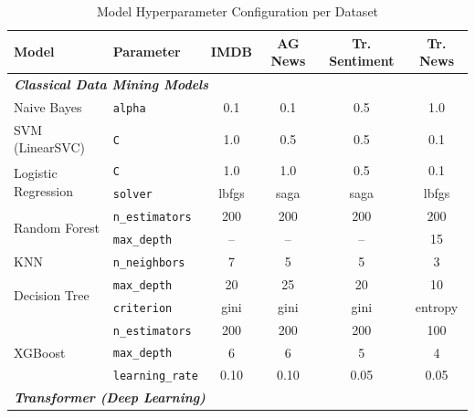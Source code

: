 \documentclass[conference]{IEEEtran}
\begin{document}
\begin{table}[t]
	\caption{Model Hyperparameter Configuration per Dataset}
	\label{tab:model_params}
	\begin{center}
		\small
		\setlength{\tabcolsep}{7pt}
		\renewcommand{\arraystretch}{1.25}
		\begin{tabular}{llcccc}
			\toprule
			\rowcolor{headerblue}
			\color{white}\textbf{Model} &
			\color{white}\textbf{Parameter} &
			\color{white}\textbf{IMDB} &
			\color{white}\textbf{AG News} &
			\color{white}\textbf{Tr. Sentiment} &
			\color{white}\textbf{Tr. News} \\
			\midrule
			\multicolumn{6}{l}{\cellcolor{groupgray}\textit{\textbf{Classical Data Mining Models}}} \\
			\midrule
			Naive Bayes         & \texttt{alpha}         & 0.1   & 0.1   & 0.5   & 1.0 \\
			\midrule
			SVM (LinearSVC)     & \texttt{C}             & 1.0   & 0.5   & 0.5   & 0.1 \\
			\midrule
			\multirow{2}{*}{Logistic Regression}
			                    & \texttt{C}             & 1.0   & 1.0   & 0.5   & 0.1 \\
			                    & \texttt{solver}        & lbfgs & saga  & saga  & lbfgs \\
			\midrule
			\multirow{2}{*}{Random Forest}
			                    & \texttt{n\_estimators} & 200   & 200   & 200   & 200 \\
			                    & \texttt{max\_depth}    & --    & --    & --    & 15 \\
			\midrule
			KNN                 & \texttt{n\_neighbors}  & 7     & 5     & 5     & 3 \\
			\midrule
			\multirow{2}{*}{Decision Tree}
			                    & \texttt{max\_depth}    & 20    & 25    & 20    & 10 \\
			                    & \texttt{criterion}     & gini  & gini  & gini  & entropy \\
			\midrule
			\multirow{3}{*}{XGBoost}
			                    & \texttt{n\_estimators} & 200   & 200   & 200   & 100 \\
			                    & \texttt{max\_depth}    & 6     & 6     & 5     & 4 \\
			                    & \texttt{learning\_rate}& 0.10  & 0.10  & 0.05  & 0.05 \\
			\midrule
			\multicolumn{6}{l}{\cellcolor{groupgray}\textit{\textbf{Transformer (Deep Learning)}}} \\

\end{tabular}
\end{center}
\end{table}
\end{document}
